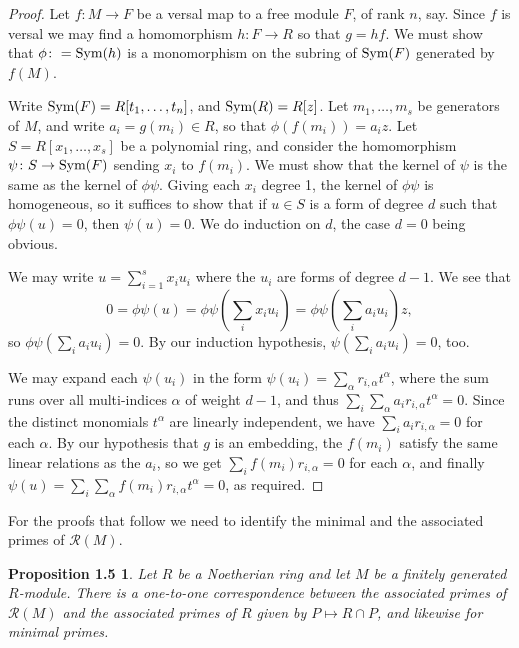\documentclass{proc-l}
\theoremstyle{plain}
\newtheorem*{theorem4}{Proposition 1.5}
\theoremstyle{definition}
\newcommand{\R}{\mathcal R}
\newcommand{\Sym}{\hbox {\rm Sym}}
\begin{document}
\begin{proof} Let $f \colon M\to F$ be a versal map to a free
module $F$, of rank $n$, say. Since $f$ is versal we may find a
homomorphism $h \colon F\to R$ so that $g = hf$. We must show that
$\phi \colon =\Sym (h)$ is a monomorphism on the subring of
$\Sym (F)$ generated by $f(M)$.

Write $\Sym (F)=R[t_{1},\dots ,t_{n}]$, and $\Sym (R)=R[z]$. Let
$m_{1},\dots ,m_{s}$ be generators of $M$, and write $a_{i}=g(m_{i})\in R$,
so that $\phi(f(m_{i}))=a_{i}z$. Let $S=R[x_{1},\dots ,x_{s}]$ be a polynomial
ring, and consider the homomorphism $\psi \colon S\to \Sym (F)$
sending $x_{i}$ to $f(m_{i})$. We must show that the kernel of $\psi $
is the same as the kernel of $\phi \psi $. Giving each $x_{i}$ degree
1, the kernel of $\phi \psi $ is homogeneous, so it suffices to show
that if $u\in S$ is a form of degree $d$ such that $\phi \psi (u)=0$,
then $\psi (u) =0$. We do induction on $d$, the case $d=0$ being
obvious.

We may write ${u = \sum ^{s}_{i=1} x_{i}u_{i}}$ where the $u_{i}$ are forms
of degree $d-1$. We see that
\begin{equation*}0 =\phi \psi (u) =\phi \psi (\sum _{i}x_{i}u_{i}) =\phi \psi (\sum _{i}a_{i}u_{i})z,
\end{equation*}
so $\phi \psi (\sum _{i}a_{i}u_{i})=0$. By our induction hypothesis,
$\psi (\sum _{i}a_{i}u_{i})=0$, too.

We may expand each $\psi (u_{i})$ in the form $\psi (u_{i})=\sum _{\alpha }r_{i,\alpha }t^{\alpha }$, where the sum runs over all multi-indices
$\alpha $ of weight 
$d-1$, and thus $\sum _{i}\sum _{\alpha }a_{i}r_{i,\alpha }t^{\alpha }= 0$. Since the distinct monomials
$t^{\alpha }$ are linearly independent, we have
$\sum _{i}a_{i}r_{i,\alpha }=0$ for each $\alpha $. By our hypothesis
that $g$ is an embedding, the $f(m_{i})$ satisfy the same linear
relations as the $a_{i}$, so we get $\sum _{i}f(m_{i})r_{i,\alpha }=0$ for
each $\alpha $, and finally $\psi (u)=\sum _{i}\sum _{\alpha }f(m_{i})r_{i,\alpha }t^{\alpha }= 0$, as required.  \end{proof}


For the proofs that follow we need to identify the minimal and the
associated primes of $\R (M)$.

\begin{theorem4} Let $R$ be a Noetherian ring and let
$M$ be a finitely generated $R$-module. There is a one-to-one
correspondence between the associated primes of $\R (M)$ and the
associated primes of $R$ given by $P\mapsto R\cap P$, and likewise
for minimal primes.
\end{theorem4}
\end{document}
